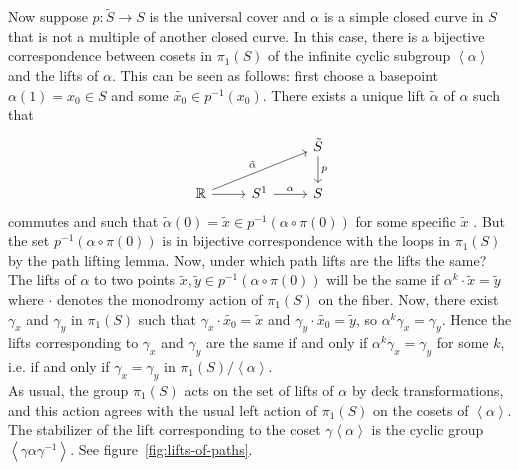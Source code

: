 \documentclass[reqno]{amsart}
\theoremstyle{definition}
\theoremstyle{remark}
\begin{document}
Now suppose $p \colon \tilde{S} \to S$ is the universal cover
and $\alpha$ is a simple closed curve in $S$ that is
not a multiple of another closed curve. In this case, there
is a bijective correspondence
between cosets in $ \pi_1 (S)$
 of the infinite cyclic subgroup $\left<\alpha \right>$ and
 the lifts of $\alpha$. This can be seen as follows: first choose
 a basepoint $\alpha(1) =  x_0 \in S$
and
 some $\tilde{x_0} \in p^{-1}(x_0)$. There exists a unique lift
 $\tilde{\alpha}$ of $\alpha$ such that
 \begin{equation*}
 \begin{tikzcd}
     & & \tilde{S}\ar[d, "p"] \\
     \mathbb{R} \ar[r] \ar[rru, "\tilde{\alpha}"] & S^{1} \ar[r, "\alpha"] & S
 \end{tikzcd}
 \end{equation*}
 commutes and such that
 $\tilde{\alpha}(0) = \tilde{x} \in p^{-1}(\alpha \circ \pi (0))$
 for some specific $\tilde{x}$  \cite[Cor. 4.2]{Bredon}.
 But the set
 $p^{-1} \left( \alpha \circ \pi (0) \right) $ is in bijective
 correspondence with the loops in $\pi_1 (S)$ by the path lifting lemma. 
 Now, under which path lifts are the lifts the same? The lifts of
 $\alpha$ to two points $\tilde{x}, \tilde{y} \in 
 p^{-1}\left( \alpha \circ \pi (0) \right) $ will be the same if
 $\alpha^{k} \cdot \tilde{x} = \tilde{y}$ where
 $\cdot $ denotes the monodromy action of $\pi_1 (S)$ on
 the fiber. Now, there exist $\gamma_x$ and
 $\gamma_y$ in $\pi_1 (S)$ such that
 $\gamma_x \cdot \tilde{x_0} = \tilde{x}$ and
 $\gamma_y \cdot \tilde{x_0} = \tilde{y}$, so
 $\alpha^k \gamma_x = \gamma_y$. Hence the lifts
 corresponding to $\gamma_x$ and $\gamma_y$ are the same if and only
 if $\alpha^k \gamma_x = \gamma_y$ for some $k$, i.e. if and only if
 $\gamma_x = \gamma_y$ in $\pi_1(S) / \left<\alpha \right>$.\\
 \linebreak
 As usual, the group $\pi_1 (S)$ acts on the set of lifts
 of $\alpha$ by deck transformations, and this action agrees
 with the usual left action of $\pi_1 (S)$ on the
 cosets of $\left<\alpha \right>$. The stabilizer of the lift
 corresponding to the coset $\gamma \left<\alpha \right>$ is
 the cyclic group $\left<\gamma \alpha \gamma^{-1} \right>$. See
 figure~\ref{fig:lifts-of-paths}.
\end{document}
